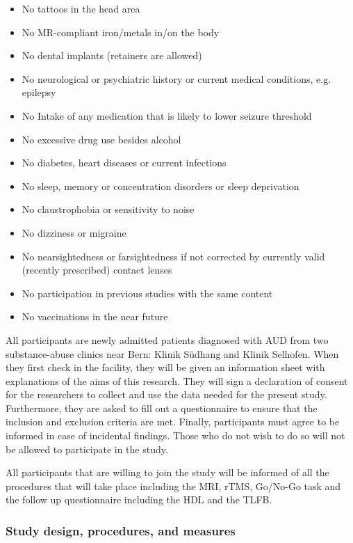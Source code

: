 \documentclass[12pt]{article}
\begin{document}
\begin{itemize}
\item No tattoos in the head area 
\item No MR-compliant iron/metals in/on the body
\item No dental implants (retainers are allowed)
\item No neurological or psychiatric history or current medical conditions, e.g. epilepsy
\item No Intake of any medication that is likely to lower seizure threshold
\item No excessive drug use besides alcohol
\item No diabetes, heart diseases or current infections
\item No sleep, memory or concentration disorders or sleep deprivation
\item No claustrophobia or sensitivity to noise
\item No dizziness or migraine 
\item No nearsightedness or farsightedness if not corrected by currently valid (recently prescribed) contact lenses
\item No participation in previous studies with the same content  
\item No vaccinations in the near future 
\end{itemize}

All participants are newly admitted patients diagnosed with AUD from two substance-abuse clinics near Bern: Klinik Südhang and Klinik Selhofen. When they first check in the facility, they will be given an information sheet with explanations of the aims of this research. They will sign a declaration of consent for the researchers to collect and use the data needed for the present study. Furthermore, they are asked to fill out a questionnaire to ensure that the inclusion and exclusion criteria are met. Finally, participants must agree to be informed in case of incidental findings. Those who do not wish to do so will not be allowed to participate in the study.

All participants that are willing to join the study will be informed of all the procedures that will take place including the MRI, rTMS, Go/No-Go task and the follow up questionnaire including the HDL and the TLFB.

\subsubsection{Study design, procedures, and measures}
\end{document}
